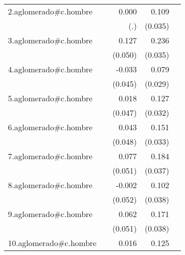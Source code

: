 {\begin{longtable}{l*{4}{D{.}{.}{-1}}}
\addlinespace
2.aglomerado#c.hombre&                     &       0.000         &       0.109\sym{**} &                     \\
            &                     &         (.)         &     (0.035)         &                     \\
\addlinespace
3.aglomerado#c.hombre&                     &       0.127\sym{*}  &       0.236\sym{***}&                     \\
            &                     &     (0.050)         &     (0.035)         &                     \\
\addlinespace
4.aglomerado#c.hombre&                     &      -0.033         &       0.079\sym{**} &                     \\
            &                     &     (0.045)         &     (0.029)         &                     \\
\addlinespace
5.aglomerado#c.hombre&                     &       0.018         &       0.127\sym{***}&                     \\
            &                     &     (0.047)         &     (0.032)         &                     \\
\addlinespace
6.aglomerado#c.hombre&                     &       0.043         &       0.151\sym{***}&                     \\
            &                     &     (0.048)         &     (0.033)         &                     \\
\addlinespace
7.aglomerado#c.hombre&                     &       0.077         &       0.184\sym{***}&                     \\
            &                     &     (0.051)         &     (0.037)         &                     \\
\addlinespace
8.aglomerado#c.hombre&                     &      -0.002         &       0.102\sym{**} &                     \\
            &                     &     (0.052)         &     (0.038)         &                     \\
\addlinespace
9.aglomerado#c.hombre&                     &       0.062         &       0.171\sym{***}&                     \\
            &                     &     (0.051)         &     (0.038)         &                     \\
\addlinespace
10.aglomerado#c.hombre&                     &       0.016         &       0.125\sym{***}&                     \\

\end{longtable}}
